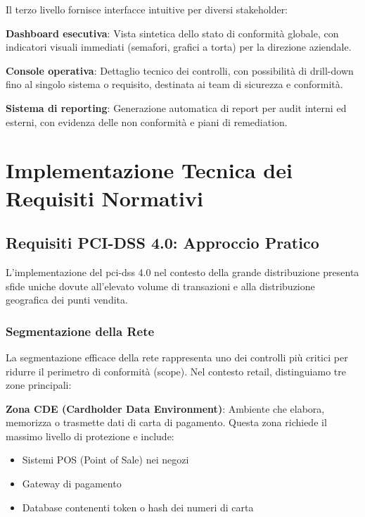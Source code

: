 Il terzo livello fornisce interfacce intuitive per diversi stakeholder:

\textbf{Dashboard esecutiva}: Vista sintetica dello stato di conformità globale, con indicatori visuali immediati (semafori, grafici a torta) per la direzione aziendale.

\textbf{Console operativa}: Dettaglio tecnico dei controlli, con possibilità di drill-down fino al singolo sistema o requisito, destinata ai team di sicurezza e conformità.

\textbf{Sistema di reporting}: Generazione automatica di report per audit interni ed esterni, con evidenza delle non conformità e piani di remediation.

\section{Implementazione Tecnica dei Requisiti Normativi}
\label{sec:4.4_implementazione}

\subsection{Requisiti PCI-DSS 4.0: Approccio Pratico}
\label{subsec:4.4.1_pcidss}

L'implementazione del \gls{pci-dss} 4.0 nel contesto della grande distribuzione presenta sfide uniche dovute all'elevato volume di transazioni e alla distribuzione geografica dei punti vendita.

\subsubsection{Segmentazione della Rete}

La segmentazione efficace della rete rappresenta uno dei controlli più critici per ridurre il perimetro di conformità (scope). Nel contesto retail, distinguiamo tre zone principali:

\textbf{Zona CDE (Cardholder Data Environment)}: Ambiente che elabora, memorizza o trasmette dati di carta di pagamento. Questa zona richiede il massimo livello di protezione e include:
\begin{itemize}
    \item Sistemi POS (Point of Sale) nei negozi
    \item Gateway di pagamento
    \item Database contenenti token o hash dei numeri di carta
\end{itemize}

